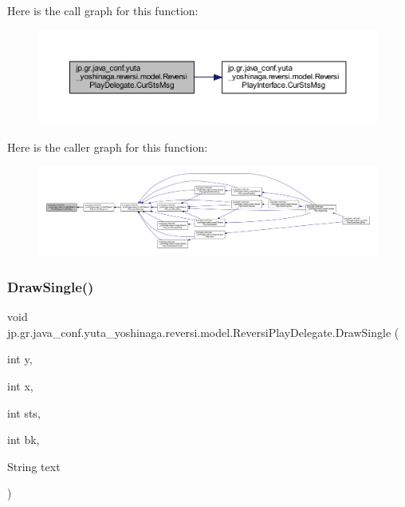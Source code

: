 Here is the call graph for this function\+:
\nopagebreak
\begin{figure}[H]
\begin{center}
\leavevmode
\includegraphics[width=350pt]{classjp_1_1gr_1_1java__conf_1_1yuta__yoshinaga_1_1reversi_1_1model_1_1_reversi_play_delegate_a775f366a6cbb877fe8ea577ef869d6b5_cgraph}
\end{center}
\end{figure}
Here is the caller graph for this function\+:
\nopagebreak
\begin{figure}[H]
\begin{center}
\leavevmode
\includegraphics[width=350pt]{classjp_1_1gr_1_1java__conf_1_1yuta__yoshinaga_1_1reversi_1_1model_1_1_reversi_play_delegate_a775f366a6cbb877fe8ea577ef869d6b5_icgraph}
\end{center}
\end{figure}
\mbox{\label{classjp_1_1gr_1_1java__conf_1_1yuta__yoshinaga_1_1reversi_1_1model_1_1_reversi_play_delegate_ab72825782a2d5cfce2ddeb0add42143e}} 
\subsubsection{\texorpdfstring{Draw\+Single()}{DrawSingle()}}
{\footnotesize\ttfamily void jp.\+gr.\+java\+\_\+conf.\+yuta\+\_\+yoshinaga.\+reversi.\+model.\+Reversi\+Play\+Delegate.\+Draw\+Single (\begin{DoxyParamCaption}\item[{int}]{y,  }\item[{int}]{x,  }\item[{int}]{sts,  }\item[{int}]{bk,  }\item[{String}]{text }\end{DoxyParamCaption})}



